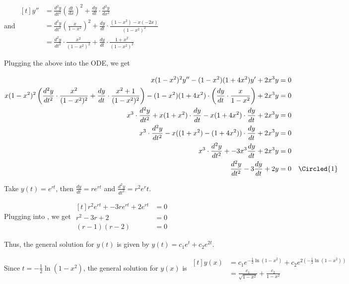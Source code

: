 \begin{enumerate}
    and $\begin{aligned}[t]
        y'' & = \frac{d^2 y}{dt^2} \left( \frac{dt}{dx} \right)^2 + \frac{dy}{dt} \cdot \frac{d^2y}{dx^2}                          \\
            & = \frac{d^2 y}{dt^2} \left( \frac{x}{1 - x^2} \right)^2 + \frac{dy}{dt} \cdot \frac{(1 - x^2) - x(-2x)}{(1 - x^2)^2} \\
            & = \frac{d^2 y}{dt^2} \cdot \frac{x^2}{(1-x^2)^2} + \frac{dy}{dt} \cdot \frac{1+ x^2}{(1 - x^2)^2}
    \end{aligned}$

    Plugging the above into the ODE, we get 

    $\begin{aligned}[t]
        x(1-x^2)^2 y'' - (1-x^2)(1+4x^2)y' + 2x^3y & = 0 \\
        x(1-x^2)^2 \left( \frac{d^2 y}{dt^2} \cdot \frac{x^2}{(1-x^2)^2} + \frac{dy}{dt} \cdot \frac{x^2+1}{(1-x^2)^2} \right) - (1-x^2)(1+4x^2) \cdot \left( \frac{dy}{dt} \cdot \frac{x}{1-x^2} \right) + 2x^3y & = 0 \\
        x^3 \cdot \frac{d^2y}{dt^2} + x(1+x^2) \cdot \frac{dy}{dt} - x(1+4x^2) \cdot \frac{dy}{dt} + 2x^3y & = 0 \\
        x^3 \cdot \frac{d^2y}{dt^2} - x((1+x^2) - (1+4x^2)) \cdot \frac{dy}{dt} + 2x^3y & = 0 \\
        x^3 \cdot \frac{d^2y}{dt^2} + -3x^3 \frac{dy}{dt} + 2x^3y & = 0 \\
        \frac{d^2y}{dt^2} - 3\frac{dy}{dt} + 2y & = 0 & \Circled{1}
    \end{aligned}$

    Take $y(t) = e^{rt}$, then $\frac{dy}{dt} = re^{rt}$ and $\frac{d^2y}{dt^2} = r^2e^rt$. 

    Plugging into , we get $\begin{aligned}[t]
        r^2e^{rt} + -3re^{rt} + 2e^{rt} & = 0 \\
        r^2 - 3r + 2 & = 0 \\
        (r-1)(r-2)   & = 0
    \end{aligned}$

    Thus, the general solution for $y(t)$ is given by $y(t) = c_1 e^t + c_2 e^{2t}$. 

    Since $t = -\frac{1}{2}\ln(1-x^2)$, the general solution for $y(x)$ is $\begin{aligned}[t]
        y(x) & = c_1 e^{-\frac{1}{2}\ln(1-x^2)} + c_2 e^{2(-\frac{1}{2}\ln(1-x^2))} \\
             & = \frac{c_1}{\sqrt{1 - x^2}} + \frac{c_2}{1 - x^2}
    \end{aligned}$
\end{enumerate}

